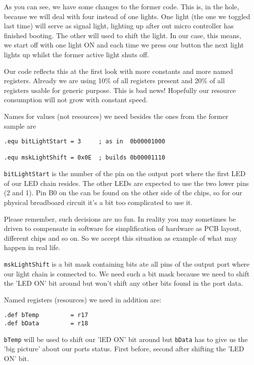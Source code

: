 As you can see, we have some changes to the former code. This is, in the hole, because we will deal with four instead of one lights. One light (the one we toggled last time) will serve as signal light, lighting up after out micro controller has finished booting. The other will used to shift the light. In our case, this means, we start off with one light ON and each time we press our button the next light lights up whilst the former active light shuts off.

Our code reflects this at the first look with more constants and more named registers. Already we are using 10\% of all registers present and 20\% of all registers usable for generic purpose. This is bad news! Hopefully our resource consumption will not grow with constant speed.

Names for values (not resources) we need besides the ones from the former sample are

\begin{lstlisting}
.equ bitLightStart = 3     ; as in  0b00001000

.equ mskLightShift = 0x0E  ; builds 0b00001110
\end{lstlisting}

\texttt{bitLightStart} is the number of the pin on the output port where the first LED of our LED chain resides. The other LEDs are expected to use the two lower pins (2 and 1). Pin B0 on the \at can be found on the other side of the chips, so for our physical breadboard circuit it's a bit too complicated to use it.

Please remember, such decisions are no fun. In reality you may sometimes be driven to compensate in software for simplification of hardware as PCB layout, different chips and so on. So we accept this situation as example of what may happen in real life.

\texttt{mskLightShift} is a bit mask containing bits ate all pins of the output port where our light chain is connected to. We need such a bit mask because we need to shift the 'LED ON' bit around but won't shift any other bits found in the port data.

Named registers (resources) we need in addition are:
 
\begin{lstlisting}
.def bTemp         = r17
.def bData         = r18
\end{lstlisting}

\texttt{bTemp} will be used to shift our 'lED ON' bit around but \texttt{bData} has to give us the 'big picture' about our ports status. First before, second after shifting the 'LED ON' bit.

